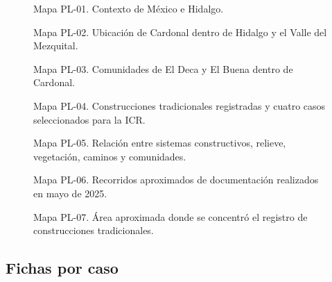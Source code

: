 \begin{figure}[p]
	\centering
	\caption{Mapa PL-01. Contexto de México e Hidalgo.}
	\label{fig:pl01_contexto_mexico_hidalgo}
\end{figure}

\begin{figure}[p]
	\centering
	\caption{Mapa PL-02. Ubicación de Cardonal dentro de Hidalgo y el Valle del Mezquital.}
	\label{fig:pl02_hidalgo_cardonal}
\end{figure}

\begin{figure}[p]
	\centering
	\caption{Mapa PL-03. Comunidades de El Deca y El Buena dentro de Cardonal.}
	\label{fig:pl03_cardonal_comunidades}
\end{figure}

\begin{figure}[p]
	\centering
	\caption{Mapa PL-04. Construcciones tradicionales registradas y cuatro casos seleccionados para la ICR.}
	\label{fig:pl04_construcciones_registradas}
\end{figure}

\begin{figure}[p]
	\centering
	\caption{Mapa PL-05. Relación entre sistemas constructivos, relieve, vegetación, caminos y comunidades.}
	\label{fig:pl05_materiales_territorio}
\end{figure}

\begin{figure}[p]
	\centering
	\caption{Mapa PL-06. Recorridos aproximados de documentación realizados en mayo de 2025.}
	\label{fig:pl06_recorridos_documentacion}
\end{figure}

\begin{figure}[p]
	\centering
	\caption{Mapa PL-07. Área aproximada donde se concentró el registro de construcciones tradicionales.}
	\label{fig:pl07_area_registro_constructivo}
\end{figure}

\FloatBarrier

\subsection{Fichas por caso}

